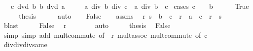 \begin{isabellebody}
\ \ \ {\isachardoublequoteopen}c\ dvd\ b{\isachardoublequoteclose}\ {\isachardoublequoteopen}b\ dvd\ a{\isachardoublequoteclose}\isanewline
\ \ \ \ \ {\isachardoublequoteopen}a\ div\ {\isacharparenleft}{\kern0pt}b\ div\ c{\isacharparenright}{\kern0pt}\ {\isacharequal}{\kern0pt}\ a\ div\ b\ {\isacharasterisk}{\kern0pt}\ c{\isachardoublequoteclose}\isanewline
%
\isadelimproof
%
\endisadelimproof
%
\isatagproof
{}\isamarkupfalse%
\ {\isacharparenleft}{\kern0pt}cases\ {\isachardoublequoteopen}c\ {\isacharequal}{\kern0pt}\ {}\ {\isasymor}\ b\ {\isacharequal}{\kern0pt}\ {}{\isachardoublequoteclose}{\isacharparenright}{\kern0pt}\isanewline
\ \ \isamarkupfalse%
\ True\isanewline
\ \ \isamarkupfalse%
\ \isamarkupfalse%
\ {\isacharquery}{\kern0pt}thesis\isanewline
\ \ \ \ \isamarkupfalse%
\ auto\isanewline
{}\isamarkupfalse%
\isanewline
\ \ \isamarkupfalse%
\ False\isanewline
\ \ \isamarkupfalse%
\ assms\ \isamarkupfalse%
\ r\ s\ \ {\isachardoublequoteopen}b\ {\isacharequal}{\kern0pt}\ c\ {\isacharasterisk}{\kern0pt}\ r{\isachardoublequoteclose}\ \ {\isachardoublequoteopen}a\ {\isacharequal}{\kern0pt}\ c\ {\isacharasterisk}{\kern0pt}\ r\ {\isacharasterisk}{\kern0pt}\ s{\isachardoublequoteclose}\isanewline
\ \ \ \ \isamarkupfalse%
\ blast\isanewline
\ \ \isamarkupfalse%
\ \isamarkupfalse%
\ False\ \isamarkupfalse%
\ {\isachardoublequoteopen}r\ {\isasymnoteq}\ {}{\isachardoublequoteclose}\isanewline
\ \ \ \ \isamarkupfalse%
\ auto\isanewline
\ \ \isamarkupfalse%
\ \isamarkupfalse%
\ {\isacharquery}{\kern0pt}thesis\ \isamarkupfalse%
\ False\isanewline
\ \ \ \ \isamarkupfalse%
\ simp\ {\isacharparenleft}{\kern0pt}simp\ add{\isacharcolon}{\kern0pt}\ mult{\isachardot}{\kern0pt}commute\ {\isacharbrackleft}{\kern0pt}of\ {\isacharunderscore}{\kern0pt}\ r{\isacharbrackright}{\kern0pt}\ mult{\isachardot}{\kern0pt}assoc\ mult{\isachardot}{\kern0pt}commute\ {\isacharbrackleft}{\kern0pt}of\ c{\isacharbrackright}{\kern0pt}{\isacharparenright}{\kern0pt}\isanewline
{}\isamarkupfalse%
%
\endisatagproof
{\isafoldproof}%
%
\isadelimproof
\isanewline
%
\endisadelimproof
\isanewline
{}\isamarkupfalse%
\ div{\isacharunderscore}{\kern0pt}div{\isacharunderscore}{\kern0pt}div{\isacharunderscore}{\kern0pt}same{\isacharcolon}{\kern0pt}\isanewline

\end{isabellebody}
